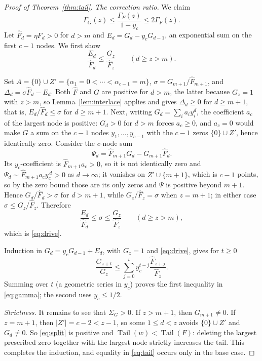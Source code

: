 \documentclass[11pt]{article}
\DeclareMathOperator{\Tail}{Tail}
\begin{document}
\begin{proof}[Proof of Theorem~\ref{thm:tail}]
\emph{The correction ratio.}  We claim
\begin{equation}\label{eq:gamma}
  \Gamma_G(z)\le\frac{\Gamma_F(z)}{1-y_c}\le2\Gamma_F(z).
\end{equation}
Let $\widehat F_d=\eta F_d>0$ for $d>m$ and
$E_d=G_d-y_cG_{d-1}$, an exponential sum on the first $c-1$ nodes.  We first
show
\begin{equation}\label{eq:drive}
  \frac{E_d}{\widehat F_d}\le
  \frac{G_z}{\widehat F_z}\qquad(d\ge z>m).
\end{equation}

Set $A=\{0\}\cup Z'=\{\alpha_1=0<\cdots<\alpha_{c-1}=m\}$,
$\sigma=G_{m+1}/\widehat F_{m+1}$, and
$\Delta_d=\sigma\widehat F_d-E_d$.  Both $\widehat F$ and $G$ are positive for
$d>m$, the latter because $G_z=1$ with $z>m$, so Lemma~\ref{lem:interlace}
applies and gives $\Delta_d\ge0$ for $d\ge m+1$, that is,
$E_d/\widehat F_d\le\sigma$ for $d\ge m+1$.  Next, writing $G_d=\sum_ia_iy_i^d$, the coefficient $a_c$ of the largest
node is positive: $G_d>0$ for $d>m$ forces $a_c\ge0$, and $a_c=0$ would make
$G$ a sum on the $c-1$ nodes $y_1,\ldots,y_{c-1}$ with the $c-1$ zeros
$\{0\}\cup Z'$, hence identically zero.  Consider the $c$-node sum
\[
  \Psi_d=\widehat F_{m+1}G_d-G_{m+1}\widehat F_d .
\]
Its $y_c$-coefficient is $\widehat F_{m+1}a_c>0$, so it is not identically
zero and $\Psi_d\sim\widehat F_{m+1}a_cy_c^{\,d}>0$ as $d\to\infty$; it
vanishes on $Z'\cup\{m+1\}$, which is $c-1$ points, so by the zero bound
those are its only zeros and $\Psi$ is positive beyond $m+1$.  Hence
$G_d/\widehat F_d>\sigma$ for $d>m+1$, while $G_z/\widehat F_z=\sigma$ when
$z=m+1$; in either case $\sigma\le G_z/\widehat F_z$.  Therefore
\[
  \frac{E_d}{\widehat F_d}\le\sigma\le\frac{G_z}{\widehat F_z}
  \qquad(d\ge z>m),
\]
which is \eqref{eq:drive}.

Induction in $G_d=y_cG_{d-1}+E_d$, with $G_z=1$ and
\eqref{eq:drive}, gives for $t\ge0$
\[
  \frac{G_{z+t}}{G_z}
  \le\sum_{j=0}^t y_c^{t-j}
       \frac{\widehat F_{z+j}}{\widehat F_z}.
\]
Summing over $t$ (a geometric series in $y_c$) proves the first inequality
in \eqref{eq:gamma}; the second uses $y_c\le1/2$.

\emph{Strictness.}  It remains to see that $\Sigma_G>0$.  If $z>m+1$, then
$G_{m+1}\ne0$.  If $z=m+1$, then $|Z'|=c-2<z-1$, so some $1\le d<z$ avoids
$\{0\}\cup Z'$ and $G_d\ne0$.  So \eqref{eq:split} is positive and
$\Tail(w)<\Tail(F)$: deleting the largest prescribed zero together with the
largest node strictly increases the tail.  This completes the induction, and
equality in \eqref{eq:tail} occurs only in the base case.
\end{proof}
\end{document}
